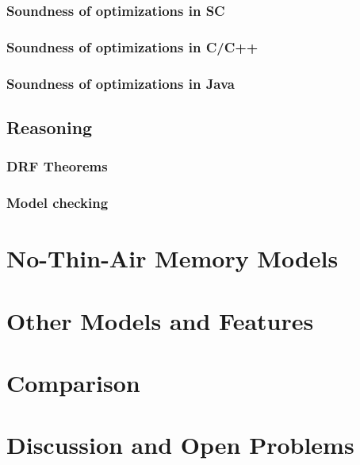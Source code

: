 \documentclass[a4paper,twoside,11pt]{article}
\numberwithin{equation}{section}
\begin{document}
\subsubsection{Soundness of optimizations in SC}

\subsubsection{Soundness of optimizations in C/C++}

\subsubsection{Soundness of optimizations in Java}

\subsection{Reasoning}

\subsubsection{DRF Theorems}

\subsubsection{Model checking}

\section{No-Thin-Air Memory Models}

\section{Other Models and Features}

\section{Comparison}

\section{Discussion and Open Problems}

 

\end{document}
